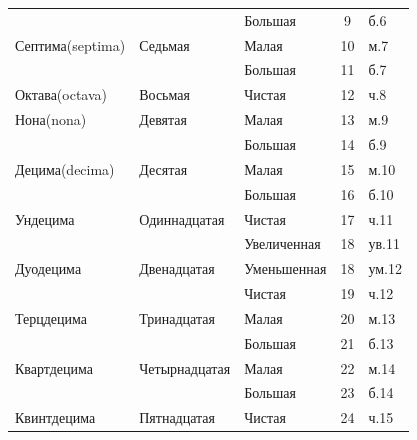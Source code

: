 \begin{table}[!ht]
\begin{tabular}{l|l|l|c|l}
                           &                    & Большая       & 9                 & б.6 \\
        Септима(septima)   & Седьмая            & Малая         & 10                & м.7 \\
                           &                    & Большая       & 11                & б.7 \\
        Октава(octava)     & Восьмая            & Чистая        & 12                & ч.8 \\
        \hline\hline
        Нона(nona)         & Девятая            & Малая         & 13                & м.9  \\
                           &                    & Большая       & 14                & б.9  \\
        Децима(decima)     & Десятая            & Малая         & 15                & м.10 \\
                           &                    & Большая       & 16                & б.10 \\
        Ундецима           & Одиннадцатая       & Чистая        & 17                & ч.11 \\
                           &                    & Увеличенная   & 18                & ув.11\\
        Дуодецима          & Двенадцатая        & Уменьшенная   & 18                & ум.12\\
                           &                    & Чистая        & 19                & ч.12 \\
        Терцдецима         & Тринадцатая        & Малая         & 20                & м.13 \\
                           &                    & Большая       & 21                & б.13 \\
        Квартдецима        & Четырнадцатая      & Малая         & 22                & м.14 \\
                           &                    & Большая       & 23                & б.14 \\
        Квинтдецима        & Пятнадцатая        & Чистая        & 24                & ч.15 \\
        \hline\hline
    \end{tabular}
\end{table}

